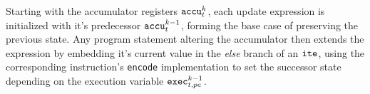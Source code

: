 Starting with the accumulator registers $\texttt{accu}^k_t$, each update expression is initialized with it's predecessor $\texttt{accu}^{k - 1}_t$, forming the base case of preserving the previous state.
Any program statement altering the accumulator then extends the expression by embedding it's current value in the \emph{else} branch of an $\texttt{ite}$, using the corresponding instruction's \texttt{encode} implementation to set the successor state
depending on the
execution variable $\texttt{exec}^{k - 1}_{t, pc}$.

